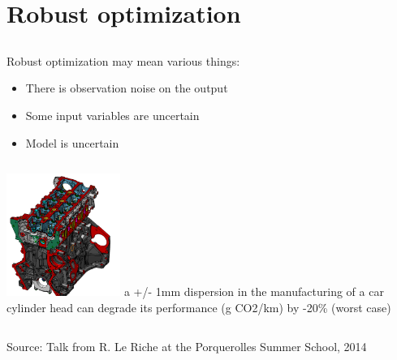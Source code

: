 \section[Robust optim.]{Robust optimization}
\subsection{}

\begin{frame}{}
Robust optimization may mean various things:
\begin{itemize}
	\item There is observation noise on the output
	\item Some input variables are uncertain
	\item Model is uncertain
\end{itemize}
\vspace{2mm}
\begin{example}
\begin{columns}[c]
\column{3cm}
	\includegraphics[height=4cm]{4_optimization/figures/RLRrobust}
\column{5cm}
	a +/- 1mm dispersion in the manufacturing of a car cylinder head  can degrade its performance (g CO2/km) by -20\% (worst case)\\
\end{columns}
\vspace{3mm}
	\small Source: Talk from R. Le Riche at the Porquerolles Summer School, 2014
\end{example}
\end{frame}

